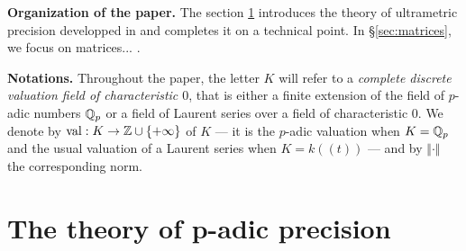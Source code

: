 \documentclass{sig-alternate}
\DeclareMathOperator{\val}{val}
\begin{document}
\begin{comment}
The present paper, which may be considered as a continuation of 
\cite{caruso-roe-vaccon:14a}, aims at using the theory of \emph{loc. 
cit.} in order to analyse the $p$-adic stability of many standard 
algorithms for computing with basic algebraic structures: numbers, 
matrices, univariate polynomials and vector spaces. For each considered 
algorithm, we will follow the same protocol: 
first, we will compute the theoretical loss of precision of the 
underlying question using the framework of \cite{caruso-roe-vaccon:14a} 
and then compare it to those observed in available implementations in 
\textsc{pari} \cite{pari}, \textsc{magma} \cite{magma} and/or 
\textsc{sage} \cite{sage}.

The conclusion of our analysis is that generic algorithms which are 
designed to work over an arbitrary field are often quite unstable. Very 
roughly, denoting by $D$ the number of divisions performed by the 
algorithm under analysis and by $q$ the cardinality of the residue 
field, it appears that the numbers of lost digits is about $O(\frac D 
q)$ whereas the theoretical loss of precision is closer than $O(\log_q 
D)$ --- and sometimes even $O(1)$. We would like to underline in 
particular that the instability phenomema are much more apparent when 
the residue field is small. It is the reason why we will always take
$K = \Q_2$ is our examples.
\end{comment}

\medskip

\noindent
{\bf Organization of the paper.}
The section \ref{sec:theory} introduces the theory of ultrametric 
precision developped in \cite{caruso-roe-vaccon:14a} and completes 
it on a technical point.
In \S \ref{sec:matrices}, we focus on matrices... .

\medskip

\noindent
{\bf Notations.}
Throughout the paper, the letter $K$ will refer to a \emph{complete 
discrete valuation field of characteristic $0$}, that is either a finite 
extension of the field of $p$-adic numbers $\mathbb Q_p$ or a field of Laurent 
series over a field of characteristic $0$. We denote by $\val : K \to \Z 
\cup \{+\infty\}$ of $K$ --- it is the $p$-adic valuation when $K = \mathbb Q_p$ 
and the usual valuation of a Laurent series when $K = k((t))$ --- and by 
$\Vert \cdot \Vert$ the corresponding norm.

\section{The theory of p-adic precision}
\label{sec:theory}
\end{document}
